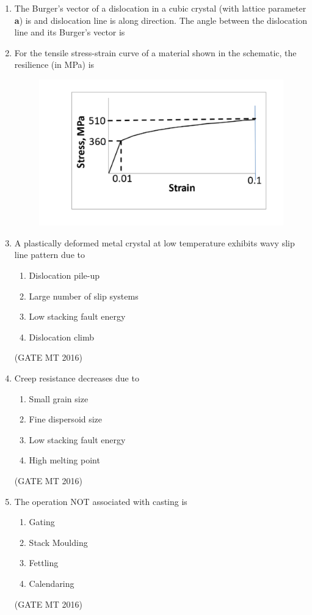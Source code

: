 \documentclass[journal, 11pt, onecolumn]{IEEEtran}
\theoremstyle{remark}
\begin{document}
\begin{enumerate}
\item The Burger's vector of a dislocation in a cubic crystal (with lattice parameter \textbf{a}) is  and dislocation line is along  direction. The angle  between the dislocation line and its Burger's vector is

\item For the tensile stress-strain curve of a material shown in the schematic, the resilience (in MPa) is

\begin{figure}[H]
    \centering
    \includegraphics[width=0.5\linewidth]{figs/a6f3.png}
    \caption{}
    \label{fig:placeholder}
\end{figure}

\item A plastically deformed metal crystal at low temperature exhibits wavy slip line pattern due
to
\begin{multicols}{2}
\begin{enumerate}
\item Dislocation pile-up
\item Large number of slip systems
\item Low stacking fault energy
\item Dislocation climb
\end{enumerate}
\end{multicols}
\hfill(GATE MT 2016)

\item Creep resistance decreases due to
\begin{multicols}{2}
\begin{enumerate}
\item Small grain size
\item Fine dispersoid size
\item Low stacking fault energy
\item High melting point
\end{enumerate}
\end{multicols}
\hfill(GATE MT 2016)

\item The operation NOT associated with casting is
\begin{multicols}{2}
\begin{enumerate}
\item Gating
\item Stack Moulding
\item Fettling
\item Calendaring
\end{enumerate}
\end{multicols}
\hfill(GATE MT 2016)


\end{enumerate}
\end{document}
